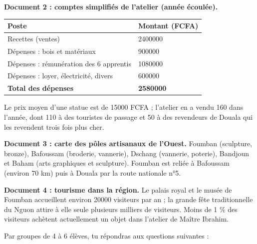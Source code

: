 \documentclass[11pt]{article}
\newcounter{popsec}
\newcounter{popsub}
\newcommand{\courssub}[1]{%
  \stepcounter{popsub}%
  \par\vspace{9pt}\noindent{\popxbold\fontsize{11.5}{13}\selectfont\color{popink}{\color{poporange}\thepopsec.\thepopsub}\hspace{6pt}#1}\par\nopagebreak\vspace{4pt}
}
\begin{document}
\textbf{Document 2 : comptes simplifiés de l'atelier (année écoulée).}

\begin{center}
\begin{tabularx}{\linewidth}{|l|X|}\hline
\rowcolor{popblueL} \textbf{Poste} & \textbf{Montant (FCFA)} \\ \hline
Recettes (ventes) & \num{2400000} \\ \hline
Dépenses : bois et matériaux & \num{900000} \\ \hline
Dépenses : rémunération des 6 apprentis & \num{1080000} \\ \hline
Dépenses : loyer, électricité, divers & \num{600000} \\ \hline
\textbf{Total des dépenses} & \textbf{\num{2580000}} \\ \hline
\end{tabularx}
\end{center}

Le prix moyen d'une statue est de \num{15000} FCFA ; l'atelier en a vendu 160 dans l'année, dont 110 à des touristes de passage et 50 à des revendeurs de Douala qui les revendent trois fois plus cher.

\textbf{Document 3 : carte des pôles artisanaux de l'Ouest.} Foumban (sculpture, bronze), Bafoussam (broderie, vannerie), Dschang (vannerie, poterie), Bandjoun et Baham (arts graphiques et sculpture). Foumban est reliée à Bafoussam (environ 70 km) puis à Douala par la route nationale n°5.

\textbf{Document 4 : tourisme dans la région.} Le palais royal et le musée de Foumban accueillent environ \num{20000} visiteurs par an ; la grande fête traditionnelle du Nguon attire à elle seule plusieurs milliers de visiteurs. Moins de 1 \% des visiteurs achètent actuellement un objet dans l'atelier de Maître Ibrahim.

\courssub{Consignes}

Par groupes de 4 à 6 élèves, tu répondras aux questions suivantes :
\end{document}

